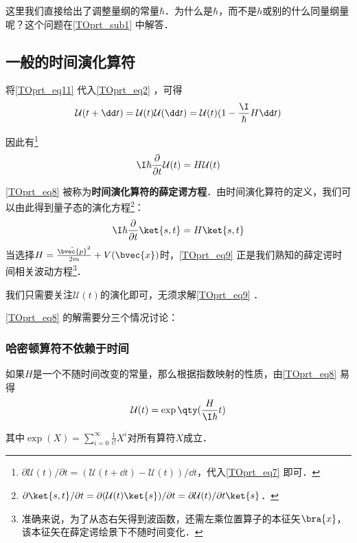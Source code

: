 这里我们直接给出了调整量纲的常量$\hbar$．为什么是$\hbar$，而不是$h$或别的什么同量纲量呢？这个问题在\autoref{TOprt_sub1} 中解答．



\subsection{一般的时间演化算符}

将\autoref{TOprt_eq11} 代入\autoref{TOprt_eq2} ，可得
\begin{equation}\label{TOprt_eq7}
\mathcal{U}(t+\dd t) = \mathcal{U}(t)\mathcal{U}(\dd t) = \mathcal{U}(t)(1-\frac{\I}{\hbar}H \dd t)
\end{equation}

因此有\footnote{$\partial\mathcal{U}(t)/\partial t=(\mathcal{U}(t+\dd t)-\mathcal{U}(t))/\dd t$，代入\autoref{TOprt_eq7} 即可．}
\begin{equation}\label{TOprt_eq8}
\I\hbar\frac{\partial}{\partial t}\mathcal{U}(t) = H\mathcal{U}(t)
\end{equation}


\autoref{TOprt_eq8} 被称为\textbf{时间演化算符的薛定谔方程}．由时间演化算符的定义，我们可以由此得到量子态的演化方程\footnote{$\partial\ket{s, t}/\partial t=\partial(\mathcal{U}(t)\ket{s})/\partial t=\partial \mathcal{U}(t)/\partial t \ket{s}$．}：
\begin{equation}\label{TOprt_eq9}
\I\hbar\frac{\partial}{\partial t}\ket{s, t} = H\ket{s, t}
\end{equation}
当选择$H=\frac{\hat{\bvec{p}}^2}{2m}+V(\bvec{x})$时，\autoref{TOprt_eq9} 正是我们熟知的薛定谔时间相关波动方程\footnote{准确来说，为了从态右矢得到波函数，还需左乘位置算子的本征矢$\bra{x}$，该本征矢在薛定谔绘景下不随时间变化．}．


我们只需要关注$\mathcal{U}(t)$的演化即可，无须求解\autoref{TOprt_eq9} ．

\autoref{TOprt_eq8} 的解需要分三个情况讨论：


\subsubsection{哈密顿算符不依赖于时间}

如果$H$是一个不随时间改变的常量，那么根据指数映射的性质，由\autoref{TOprt_eq8} 易得
\begin{equation}
\mathcal{U}(t) = \exp\qty(\frac{H}{\I \hbar}t)
\end{equation}

其中$\exp(X)=\sum_{i=0}^\infty \frac{1}{i!}X^i$对所有算符$X$成立．



